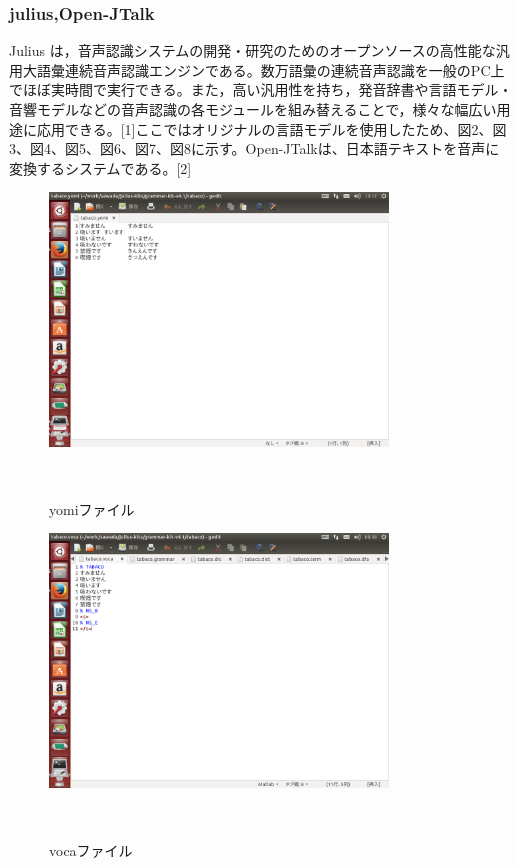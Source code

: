 \documentclass[11pt]{jsarticle}
\begin{document}
\subsubsection{julius,Open-JTalk}
Julius は，音声認識システムの開発・研究のためのオープンソースの高性能な汎用大語彙連続音声認識エンジンである。数万語彙の連続音声認識を一般のPC上でほぼ実時間で実行できる。また，高い汎用性を持ち，発音辞書や言語モデル・音響モデルなどの音声認識の各モジュールを組み替えることで，様々な幅広い用途に応用できる。[1]ここではオリジナルの言語モデルを使用したため、図2、図3、図4、図5、図6、図7、図8に示す。Open-JTalkは、日本語テキストを音声に変換するシステムである。[2]

\begin{figure}[b]
 \begin{center}
  \includegraphics[width=90mm]{yomi.png}
 　\caption{yomiファイル}
 　\label{fig:kinshi}
 \end{center}
\end{figure}

\begin{figure}[b]
 \begin{center}
  \includegraphics[width=90mm]{voca.png}
 　\caption{vocaファイル}
 　\label{fig:kinshi}
 \end{center}
\end{figure}
\end{document}
